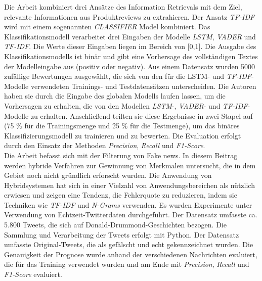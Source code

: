 Die Arbeit \cite{chiny2021lstm} kombiniert drei Ansätze des Information Retrievals mit dem Ziel, relevante Informationen aus Produktreviews zu extrahieren. Der Ansatz \emph{TF-IDF} wird mit einem sogenannten \emph{CLASSIFIER} Model kombiniert. Das Klassifikationsmodell verarbeitet drei Eingaben der Modelle \emph{LSTM}, \emph{VADER} und \emph{TF-IDF}. Die Werte dieser Eingaben liegen im Bereich von [0,1]. Die Ausgabe des Klassifikationsmodells ist binär und gibt eine Vorhersage des vollständigen Textes der Modelleingabe aus (positiv oder negativ). Aus einem Datensatz wurden 5000 zufällige Bewertungen ausgewählt, die sich von den für die LSTM- und \emph{TF-IDF}-Modelle verwendeten Trainings- und Testdatensätzen unterscheiden. Die Autoren \citeauthor{chiny2021lstm} haben sie durch die Eingabe des globalen Modells laufen lassen, um die Vorhersagen zu erhalten, die von den Modellen \emph{LSTM}-, \emph{VADER}- und \emph{TF-IDF}-Modelle zu erhalten. Anschließend teilten sie diese Ergebnisse in zwei Stapel auf (75 \% für die Trainingsmenge und 25 \% für die Testmenge), um das binäres Klassifizierungsmodell zu trainieren und zu bewerten. Die Evaluation erfolgt durch den Einsatz der Methoden \emph{Precision}, \emph{Recall} und \emph{F1-Score}.\\

Die Arbeit \cite{suhasini2021hybrid} befasst sich mit der Filterung von Fake news. In diesem Beitrag werden hybride Verfahren zur Gewinnung von Merkmalen untersucht, die in dem Gebiet noch nicht gründlich erforscht wurden. Die Anwendung von Hybridsystemen hat sich in einer Vielzahl von Anwendungsbereichen als nützlich erwiesen und zeigen eine Tendenz, die Fehlerquote zu reduzieren, indem sie Techniken wie \emph{TF-IDF} und \emph{N-Grams} verwenden. Es wurden Experimente unter Verwendung von Echtzeit-Twitterdaten durchgeführt. Der Datensatz umfasste ca. 5.800 Tweets, die sich auf Donald-Drummond-Geschichten bezogen. Die Sammlung und Verarbeitung der Tweets erfolgt mit Python. Der Datensatz umfasste Original-Tweets, die als gefälscht und echt gekennzeichnet wurden. Die Genauigkeit der Prognose wurde anhand der verschiedenen Nachrichten evaluiert, die für das Training verwendet wurden und am Ende mit \emph{Precision}, \emph{Recall} und \emph{F1-Score} evaluiert.\\

